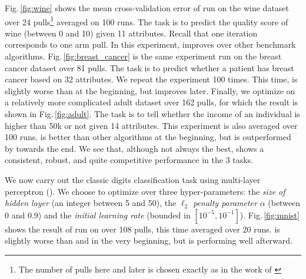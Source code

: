 Fig.\,\ref{fig:wine} shows the mean cross-validation error of \SVM run on the \UCI wine dataset over 24 pulls\footnote{The number of pulls here and later is chosen exactly as in the work of \citet{li2017hyperband}} averaged on 100 runs. The task is to predict the quality score  of wine (between 0 and 10) given 11 attributes. Recall that one iteration corresponds to one arm pull. In this experiment, \DTTTS improves over other benchmark algorithms. Fig.\,\ref{fig:breast_cancer} is the same experiment run on the \UCI breast cancer dataset over 81 pulls. The task is to predict whether a patient has breast cancer based on 32 attributes. We repeat the experiment 100 times. This time, \DTTTS is slightly worse than \Hyperband at the beginning, but improves later. Finally, we optimize \SVM on a relatively more complicated \UCI adult dataset over 162 pulls, for which the result is shown in Fig.\,\ref{fig:adult}. The task is to tell whether the income of an individual is higher than 50k or not given 14 attributes. This experiment is also averaged over 100 runs. \DTTTS is better than other algorithms at the beginning, but is outperformed by \TPE towards the end. We see that, although not always the best, \DTTTS shows a consistent, robust, and quite competitive performance in the 3 tasks. 

We now carry out the classic \MNIST digits classification task using multi-layer perceptron (\MLP). We choose to optimize over three hyper-parameters: the \emph{size of hidden layer} (an integer between 5 and 50), the \emph{$\ell_2$ penalty parameter} $\alpha$ (between 0 and 0.9) and the \emph{initial learning rate} (bounded in $\left[10^{-5}, 10^{-1} \right]$). Fig.\,\ref{fig:mnist} shows the result of \MLP run on \MNIST over 108 pulls, this time averaged over 20 runs. \DTTTS is slightly worse than \Hyperband and \HTTTS in the very beginning, but is performing well afterward. %


